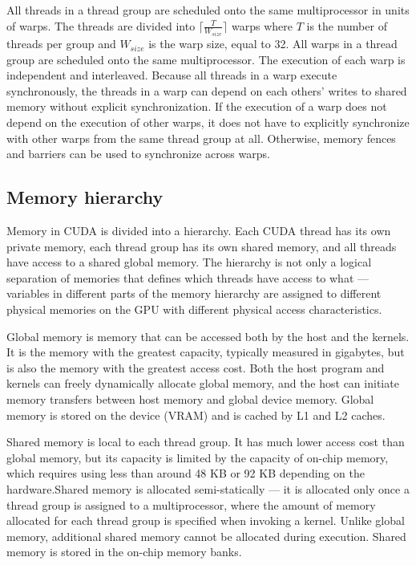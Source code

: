 All threads in a thread group are scheduled onto the same multiprocessor in units of warps. The threads are divided into \(\lceil\frac{T}{W_{size}}\rceil\) warps where \(T\) is the number of threads per group and \(W_{size}\) is the warp size, equal to 32. All warps in a thread group are scheduled onto the same multiprocessor. The execution of each warp is independent and interleaved. Because all threads in a warp execute synchronously, the threads in a warp can depend on each others' writes to shared memory without explicit synchronization. If the execution of a warp does not depend on the execution of other warps, it does not have to explicitly synchronize with other warps from the same thread group at all. Otherwise, memory fences and barriers can be used to synchronize across warps.

\subsection{Memory hierarchy}

Memory in CUDA is divided into a hierarchy. Each CUDA thread has its own private memory, each thread group has its own shared memory, and all threads have access to a shared global memory. The hierarchy is not only a logical separation of memories that defines which threads have access to what --- variables in different parts of the memory hierarchy are assigned to different physical memories on the GPU with different physical access characteristics.

Global memory is memory that can be accessed both by the host and the kernels. It is the memory with the greatest capacity, typically measured in gigabytes, but is also the memory with the greatest access cost. Both the host program and kernels can freely dynamically allocate global memory, and the host can initiate memory transfers between host memory and global device memory. Global memory is stored on the device (VRAM) and is cached by L1 and L2 caches.

Shared memory is local to each thread group. It has much lower access cost than global memory, but its capacity is limited by the capacity of on-chip memory, which requires using less than around 48 KB or 92 KB depending on the hardware.\@ Shared memory is allocated semi-statically --- it is allocated only once a thread group is assigned to a multiprocessor, where the amount of memory allocated for each thread group is specified when invoking a kernel. Unlike global memory, additional shared memory cannot be allocated during execution. Shared memory is stored in the on-chip memory banks.

